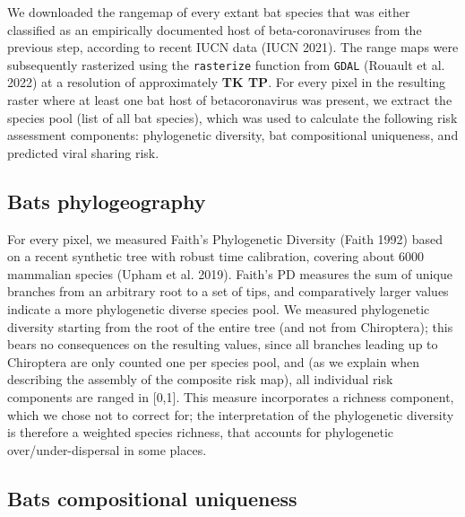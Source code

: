 \documentclass[10pt,oneside]{article}
\begin{document}
We downloaded the rangemap of every extant bat species that was either
classified as an empirically documented host of beta-coronaviruses from
the previous step, according to recent IUCN data (IUCN 2021). The range
maps were subsequently rasterized using the \texttt{rasterize} function
from \texttt{GDAL} (Rouault et al. 2022) at a resolution of
approximately \textbf{TK TP}. For every pixel in the resulting raster
where at least one bat host of betacoronavirus was present, we extract
the species pool (list of all bat species), which was used to calculate
the following risk assessment components: phylogenetic diversity, bat
compositional uniqueness, and predicted viral sharing risk.

\hypertarget{bats-phylogeography}{%
\subsection{Bats phylogeography}\label{bats-phylogeography}}

For every pixel, we measured Faith's Phylogenetic Diversity (Faith 1992)
based on a recent synthetic tree with robust time calibration, covering
about 6000 mammalian species (Upham et al. 2019). Faith's PD measures
the sum of unique branches from an arbitrary root to a set of tips, and
comparatively larger values indicate a more phylogenetic diverse species
pool. We measured phylogenetic diversity starting from the root of the
entire tree (and not from Chiroptera); this bears no consequences on the
resulting values, since all branches leading up to Chiroptera are only
counted one per species pool, and (as we explain when describing the
assembly of the composite risk map), all individual risk components are
ranged in {[}0,1{]}. This measure incorporates a richness component,
which we chose not to correct for; the interpretation of the
phylogenetic diversity is therefore a weighted species richness, that
accounts for phylogenetic over/under-dispersal in some places.

\hypertarget{bats-compositional-uniqueness}{%
\subsection{Bats compositional
uniqueness}\label{bats-compositional-uniqueness}}
\end{document}

